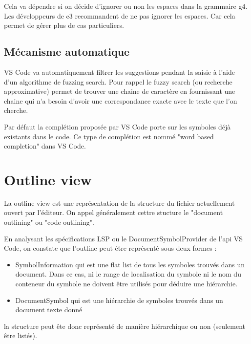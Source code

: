 \documentclass[
    iict, %
    il, %
]{heig-tb}
\begin{document}
Cela va dépendre si on décide d'ignorer ou non les espaces dans la grammaire g4.
Les développeurs de c3 recommandent de ne pas ignorer les espaces. Car cela permet de gérer plus de cas particuliers.

\subsection{Mécanisme automatique}
VS Code va automatiquement filtrer les suggestions pendant la saisie à l'aide d'un algorithme de fuzzing search.
Pour rappel le fuzzy search (ou recherche approximative) permet de trouver une chaine de caractère en fournissant une chaine qui n'a besoin d'avoir une correspondance exacte
avec le texte que l'on cherche.

Par défaut la complétion proposée par VS Code porte sur les symboles déjà existants dans le code.
Ce type de complétion est nommé "word based completion" dans VS Code.

\section{Outline view}

La outline view est une représentation de la structure du fichier actuellement ouvert par l'éditeur.
On appel généralement cettre stucture le "document outlining" ou "code outlining".

En analysant les spécifications LSP ou le DocumentSymbolProvider de l'api VS Code, on constate que l'outline peut être représenté sous deux formes :

\begin{itemize}
    \item SymbolInformation qui est une flat list de tous les symboles trouvés dans un document. Dans ce cas, ni le range de localisation du symbole ni le nom du conteneur du symbole ne doivent être utilisés pour déduire une hiérarchie.
    \item DocumentSymbol qui est une hiérarchie de symboles trouvés dans un document texte donné
\end{itemize}

la structure peut ête donc représenté de manière hiérarchique ou non (seulement être listés).

\end{document}
